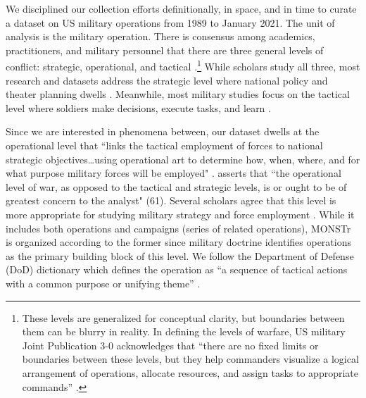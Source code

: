 \documentclass[fleqn,12pt]{article}
\begin{document}
We disciplined our collection efforts definitionally, in space, and in time to curate a dataset on US military operations from 1989 to January 2021. The unit of analysis is the military operation. There is consensus among academics, practitioners, and military personnel that there are three general levels of conflict: strategic, operational, and tactical \citep{clausewitz_war_1976, millett_effectivenessmilitaryorganizations_1986, zabecki_german1918offensives_2006}.\footnote{These levels are generalized for conceptual clarity, but boundaries between them can be blurry in reality. In defining the levels of warfare, US military Joint Publication 3-0 acknowledges that ``there are no fixed limits or boundaries between these levels, but they help commanders visualize a logical arrangement of operations, allocate resources, and assign tasks to appropriate commands” 
 \citep[I-12]{chairmanofthejointchiefsofstaff_jointpublication30_2018}.} While scholars study all three, most research and datasets address the strategic level where national policy and theater planning dwells \citep{mcmaster_derelictiondutyjohnson_1998, millett_lessonswar_1988}. Meanwhile, most military studies focus on the tactical level where soldiers make decisions, execute tasks, and learn \citep{harkness_militarymaladaptationcounterinsurgency_2015, kollars_warhorizonsoldierled_2015}.

Since we are interested in phenomena between, our dataset dwells at the operational level that ``links the tactical employment of forces to national strategic objectives…using operational art to determine how, when, where, and for what purpose military forces will be employed" \citep{chairmanofthejointchiefsofstaff_jointpublication30_2018}. \citet{luttwak_operationallevelwar_1981} asserts that ``the operational level of war, as opposed to the tactical and strategic levels, is or ought to be of greatest concern to the analyst" (61). Several scholars agree that this level is more appropriate for studying military strategy and force employment \citep{allen_understandingimpactair_2017, tecottmetz_casecampaignanalysis_2021}. While it includes both operations and campaigns (series of related operations), MONSTr is organized according to the former since military doctrine identifies operations as the primary building block of this level. We follow the Department of Defense (DoD) dictionary which defines the operation as ``a sequence of tactical actions with a common purpose or unifying theme” \citep[GL-13]{chairmanofthejointchiefsofstaff_doddictionarymilitary_2021}.
\end{document}
